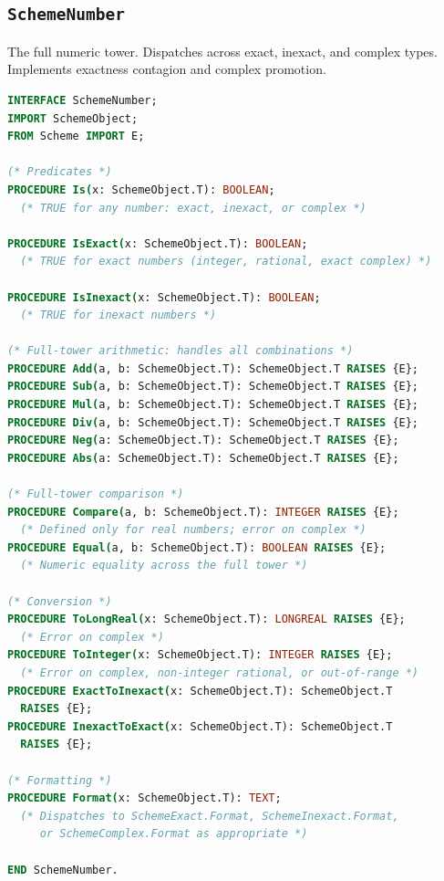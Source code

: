 \documentclass[12pt]{article}
\begin{document}
\subsection{{\tt SchemeNumber}}
\label{sec:iface-number}

The full numeric tower.  Dispatches across exact, inexact, and
complex types.  Implements exactness contagion and complex
promotion.

\begin{lstlisting}[language=Modula3]
INTERFACE SchemeNumber;
IMPORT SchemeObject;
FROM Scheme IMPORT E;

(* Predicates *)
PROCEDURE Is(x: SchemeObject.T): BOOLEAN;
  (* TRUE for any number: exact, inexact, or complex *)

PROCEDURE IsExact(x: SchemeObject.T): BOOLEAN;
  (* TRUE for exact numbers (integer, rational, exact complex) *)

PROCEDURE IsInexact(x: SchemeObject.T): BOOLEAN;
  (* TRUE for inexact numbers *)

(* Full-tower arithmetic: handles all combinations *)
PROCEDURE Add(a, b: SchemeObject.T): SchemeObject.T RAISES {E};
PROCEDURE Sub(a, b: SchemeObject.T): SchemeObject.T RAISES {E};
PROCEDURE Mul(a, b: SchemeObject.T): SchemeObject.T RAISES {E};
PROCEDURE Div(a, b: SchemeObject.T): SchemeObject.T RAISES {E};
PROCEDURE Neg(a: SchemeObject.T): SchemeObject.T RAISES {E};
PROCEDURE Abs(a: SchemeObject.T): SchemeObject.T RAISES {E};

(* Full-tower comparison *)
PROCEDURE Compare(a, b: SchemeObject.T): INTEGER RAISES {E};
  (* Defined only for real numbers; error on complex *)
PROCEDURE Equal(a, b: SchemeObject.T): BOOLEAN RAISES {E};
  (* Numeric equality across the full tower *)

(* Conversion *)
PROCEDURE ToLongReal(x: SchemeObject.T): LONGREAL RAISES {E};
  (* Error on complex *)
PROCEDURE ToInteger(x: SchemeObject.T): INTEGER RAISES {E};
  (* Error on complex, non-integer rational, or out-of-range *)
PROCEDURE ExactToInexact(x: SchemeObject.T): SchemeObject.T
  RAISES {E};
PROCEDURE InexactToExact(x: SchemeObject.T): SchemeObject.T
  RAISES {E};

(* Formatting *)
PROCEDURE Format(x: SchemeObject.T): TEXT;
  (* Dispatches to SchemeExact.Format, SchemeInexact.Format,
     or SchemeComplex.Format as appropriate *)

END SchemeNumber.
\end{lstlisting}
\end{document}
